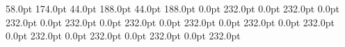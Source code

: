 58.0pt 174.0pt 
44.0pt 188.0pt 
44.0pt 188.0pt 
0.0pt 232.0pt 
0.0pt 232.0pt 
0.0pt 232.0pt 
0.0pt 232.0pt 
0.0pt 232.0pt 
0.0pt 232.0pt 
0.0pt 232.0pt 
0.0pt 232.0pt 
0.0pt 232.0pt 
0.0pt 232.0pt 
0.0pt 232.0pt 
0.0pt 232.0pt 
